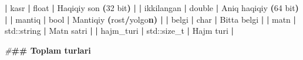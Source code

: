 \documentclass[a4paper,11pt,twoside,openright]{book}
\newenvironment{Shaded}{\begin{snugshade}}{\end{snugshade}}
\newcommand{\BuiltInTok}[1]{#1}
\newcommand{\CharTok}[1]{\textcolor[rgb]{0.31,0.60,0.02}{#1}}
\newcommand{\DecValTok}[1]{\textcolor[rgb]{0.00,0.00,0.81}{#1}}
\newcommand{\ErrorTok}[1]{\textcolor[rgb]{0.64,0.00,0.00}{\textbf{#1}}}
\newcommand{\NormalTok}[1]{#1}
\newcommand{\OperatorTok}[1]{\textcolor[rgb]{0.81,0.36,0.00}{\textbf{#1}}}
\newcommand{\PreprocessorTok}[1]{\textcolor[rgb]{0.56,0.35,0.01}{\textit{#1}}}
\begin{document}
\begin{Shaded}
\begin{Highlighting}[]
\OperatorTok{|} \ErrorTok{\textasciigrave{}}\NormalTok{kasr}\ErrorTok{\textasciigrave{}} \OperatorTok{|} \ErrorTok{\textasciigrave{}}\NormalTok{float}\ErrorTok{\textasciigrave{}} \OperatorTok{|}\NormalTok{ Haqiqiy son }\OperatorTok{(}\DecValTok{32}\NormalTok{ bit}\OperatorTok{)} \OperatorTok{|}
\OperatorTok{|} \ErrorTok{\textasciigrave{}}\NormalTok{ikkilangan}\ErrorTok{\textasciigrave{}} \OperatorTok{|} \ErrorTok{\textasciigrave{}}\NormalTok{double}\ErrorTok{\textasciigrave{}} \OperatorTok{|}\NormalTok{ Aniq haqiqiy }\OperatorTok{(}\DecValTok{64}\NormalTok{ bit}\OperatorTok{)} \OperatorTok{|}
\OperatorTok{|} \ErrorTok{\textasciigrave{}}\NormalTok{mantiq}\ErrorTok{\textasciigrave{}} \OperatorTok{|} \ErrorTok{\textasciigrave{}}\NormalTok{bool}\ErrorTok{\textasciigrave{}} \OperatorTok{|}\NormalTok{ Mantiqiy }\OperatorTok{(}\ErrorTok{\textasciigrave{}}\NormalTok{rost}\ErrorTok{\textasciigrave{}}\OperatorTok{/}\ErrorTok{\textasciigrave{}}\NormalTok{yolg}\CharTok{\textquotesingle{}o}\ErrorTok{n\textasciigrave{}) |}
\OperatorTok{|} \ErrorTok{\textasciigrave{}}\NormalTok{belgi}\ErrorTok{\textasciigrave{}} \OperatorTok{|} \ErrorTok{\textasciigrave{}}\NormalTok{char}\ErrorTok{\textasciigrave{}} \OperatorTok{|}\NormalTok{ Bitta belgi }\OperatorTok{|}
\OperatorTok{|} \ErrorTok{\textasciigrave{}}\NormalTok{matn}\ErrorTok{\textasciigrave{}} \OperatorTok{|} \ErrorTok{\textasciigrave{}}\BuiltInTok{std::}\NormalTok{string}\ErrorTok{\textasciigrave{}} \OperatorTok{|}\NormalTok{ Matn satri }\OperatorTok{|}
\OperatorTok{|} \ErrorTok{\textasciigrave{}}\NormalTok{hajm\_turi}\ErrorTok{\textasciigrave{}} \OperatorTok{|} \ErrorTok{\textasciigrave{}}\BuiltInTok{std::}\NormalTok{size\_t}\ErrorTok{\textasciigrave{}} \OperatorTok{|}\NormalTok{ Hajm turi }\OperatorTok{|}

\PreprocessorTok{\#}\ErrorTok{\#\# To\textquotesingle{}plam turlari}


\end{Highlighting}
\end{Shaded}
\end{document}

